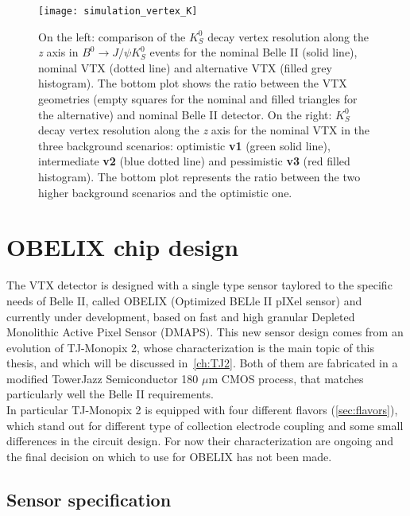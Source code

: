 \begin{figure}[h!]
\centering
\texttt{[image: simulation\_vertex\_K]}
\caption{On the left: comparison of the $K_{S}^{0}$ decay vertex resolution along the \textit{z} axis in $B^{0} \rightarrow J/\psi K_{S}^{0}$ events for the nominal Belle II (solid line), nominal VTX (dotted line) and alternative VTX (filled grey histogram). The bottom plot shows the ratio between the VTX geometries (empty squares for the nominal and filled triangles for the alternative) and nominal Belle II detector. 
On the right: $K_{S}^{0}$ decay vertex resolution along the \textit{z} axis for the nominal VTX in the three background scenarios: optimistic \textbf{v1} (green solid line), intermediate \textbf{v2} (blue dotted line) and pessimistic \textbf{v3} (red filled histogram). The bottom plot represents the ratio between the two higher background scenarios and the optimistic one.}
\label{fig:simulation_vertex_K}
\end{figure}


\section{OBELIX chip design}

The VTX detector is designed with a single type sensor taylored to the specific needs of Belle II, called OBELIX (Optimized BELle II pIXel sensor) and currently under development, based on fast and high granular Depleted Monolithic Active Pixel Sensor (DMAPS). This new sensor design comes from an evolution of TJ-Monopix 2, whose characterization is the main topic of this thesis, and which will be discussed in~\autoref{ch:TJ2}. Both of them are fabricated in a modified TowerJazz Semiconductor 180 $\mu$m CMOS process, that matches particularly well the Belle II requirements.\\ In particular TJ-Monopix 2 is equipped with four different flavors (\autoref{sec:flavors}), which stand out for different type of collection electrode coupling and some small differences in the circuit design. For now their characterization are ongoing and the final decision on which to use for OBELIX has not been made. \\

\subsection{Sensor specification}

